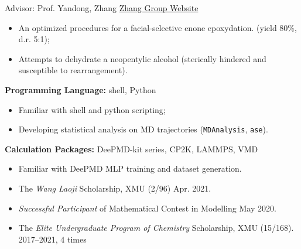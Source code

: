 \vspace{5mm}



{\noindent Advisor: Prof. Yandong, Zhang  \hfill \href{https://zhanglab.xmu.edu.cn/}{Zhang Group Website}}


\begin{itemize}
    \item An optimized procedures for a facial-selective enone epoxydation. (yield 80\%, d.r. 5:1);
    \item Attempts to dehydrate a neopentylic alcohol (sterically hindered and susceptible to rearrangement).
\end{itemize}


\vspace{5mm}

\sectionrule
{\noindent \textbf{Programming Language:} }{shell, Python}
\begin{itemize}
    \item Familiar with shell and python scripting; 
    \item Developing statistical analysis on MD trajectories (\texttt{MDAnalysis}, \texttt{ase}). 
\end{itemize}

{\noindent \textbf{Calculation Packages:} }{DeePMD-kit series, CP2K, LAMMPS, VMD}

\begin{itemize}
    \item Familiar with DeePMD MLP training and dataset generation.
\end{itemize}

\vspace{5mm}
\sectionrule

\begin{itemize}
    \item The \emph{Wang Laoji} Scholarship, XMU (2/96) \hfill Apr. 2021.
    \item \emph{Successful Participant} of Mathematical Contest in Modelling \hfill May 2020.
    \item The \emph{Elite Undergraduate Program of Chemistry} Scholarship, XMU (15/168).
        \hspace*{\fill}2017--2021, 4 times
\end{itemize}
